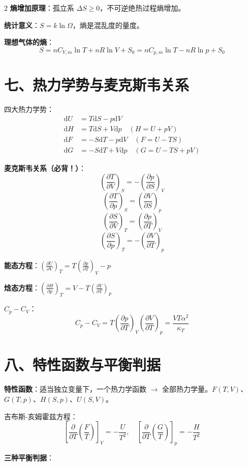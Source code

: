 \documentclass[10pt,a4paper,fontset=mac]{ctexart}
\newcommand{\dd}{\mathrm{d}}
\newcommand{\đ}{\mathrm{đ}}
\begin{document}
\begin{multicols}{2}
\textbf{熵增加原理}：孤立系 $\Delta S\ge0$，不可逆绝热过程熵增加。

\textbf{统计意义}：$S=k\ln\Omega$，熵是混乱度的量度。

\textbf{理想气体的熵}：
\[
S=nC_{V,m}\ln T+nR\ln V+S_0=nC_{p,m}\ln T-nR\ln p+S_0
\]

\section*{七、热力学势与麦克斯韦关系}

四大热力学势：
\[
\begin{aligned}
\dd U &= T\dd S-p\dd V \\
\dd H &= T\dd S+V\dd p\quad(H=U+pV) \\
\dd F &= -S\dd T-p\dd V\quad(F=U-TS) \\
\dd G &= -S\dd T+V\dd p\quad(G=U-TS+pV)
\end{aligned}
\]

\textbf{麦克斯韦关系（必背！）}：
\[
\boxed{\left(\frac{\partial T}{\partial V}\right)_S=-\left(\frac{\partial p}{\partial S}\right)_V}
\]
\[
\boxed{\left(\frac{\partial T}{\partial p}\right)_S=\left(\frac{\partial V}{\partial S}\right)_p}
\]
\[
\boxed{\left(\frac{\partial S}{\partial V}\right)_T=\left(\frac{\partial p}{\partial T}\right)_V}
\]
\[
\boxed{\left(\frac{\partial S}{\partial p}\right)_T=-\left(\frac{\partial V}{\partial T}\right)_p}
\]

\textbf{能态方程}：$(\frac{\partial U}{\partial V})_T=T(\frac{\partial p}{\partial T})_V-p$

\textbf{焓态方程}：$(\frac{\partial H}{\partial p})_T=V-T(\frac{\partial V}{\partial T})_p$

\textbf{$C_p-C_V$}：
\[
\boxed{C_p-C_V=T\left(\frac{\partial p}{\partial T}\right)_V\left(\frac{\partial V}{\partial T}\right)_p=\frac{VT\alpha^2}{\kappa_T}}
\]

\section*{八、特性函数与平衡判据}

\textbf{特性函数}：适当独立变量下，一个热力学函数 $\to$ 全部热力学量。$F(T,V)$、$G(T,p)$、$H(S,p)$、$U(S,V)$。

吉布斯-亥姆霍兹方程：
\[
\left[\frac{\partial}{\partial T}\!\left(\frac{F}{T}\right)\right]_V=-\frac{U}{T^2},\quad
\left[\frac{\partial}{\partial T}\!\left(\frac{G}{T}\right)\right]_p=-\frac{H}{T^2}
\]

\textbf{三种平衡判据}：


\end{multicols}
\end{document}
